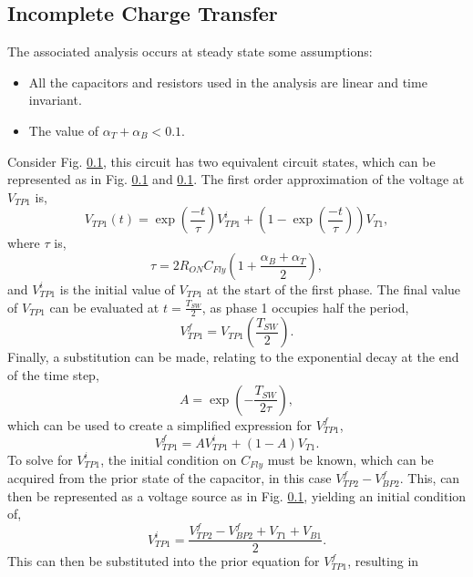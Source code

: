 \documentclass[conference]{IEEEtran}
\begin{document}
	\subsection{Incomplete Charge Transfer}
	The associated analysis occurs at steady state  some assumptions:
	\begin{itemize}
		\item All the capacitors and resistors used in the analysis are linear and time invariant.
		\item The value of $\alpha_T + \alpha_B < 0.1$.
	\end{itemize}
	Consider Fig. \ref{}, this circuit has two equivalent circuit states, which can be represented as in Fig. \ref{} and \ref{}. The first order approximation of the voltage at $V_{TP1}$ is,
	\begin{equation}
	V_{TP1}(t) = \exp\left(\frac{-t}{\tau}\right)V_{TP1}^{i} + \left(1 - \exp\left(\frac{-t}{\tau}\right)\right)V_{T1},
	\end{equation}
	where $\tau$ is,
	\begin{equation}
	\tau = 2R_{ON}C_{Fly}\left(1+\frac{\alpha_B+\alpha_T}{2}\right),
	\end{equation}
	and $V_{TP1}^i$ is the initial value of $V_{TP1}$ at the start of the first phase. The final value of $V_{TP1}$ can be evaluated at $t = \frac{T_{SW}}{2}$, as phase 1 occupies half the period,
	\begin{equation}
	V_{TP1}^f = V_{TP1}\left(\frac{T_{SW}}{2}\right).
	\end{equation}	
	Finally, a substitution can be made, relating to the exponential decay at the end of the time step,
	\begin{equation}
	A = \exp\left(-\frac{T_{SW}}{2\tau}\right),
	\end{equation}
	which can be used to create a simplified expression for $V_{TP1}^f$,
	\begin{equation}
	V_{TP1}^f = AV_{TP1}^i + (1-A)V_{T1}.
	\end{equation}
	To solve for $V_{TP1}^i$, the initial condition on $C_{Fly}$ must be known, which can be acquired from the prior state of the capacitor, in this case $V_{TP2}^f - V_{BP2}^f$. This, can then be represented as a voltage source as in Fig. \ref{}, yielding an initial condition of,
	\begin{equation}
	V_{TP1}^i = \frac{V_{TP2}^f - V_{BP2}^f + V_{T1} + V_{B1}}{2}.
	\end{equation}
	This can then be substituted into the prior equation for $V_{TP1}^f$, resulting in
\end{document}
